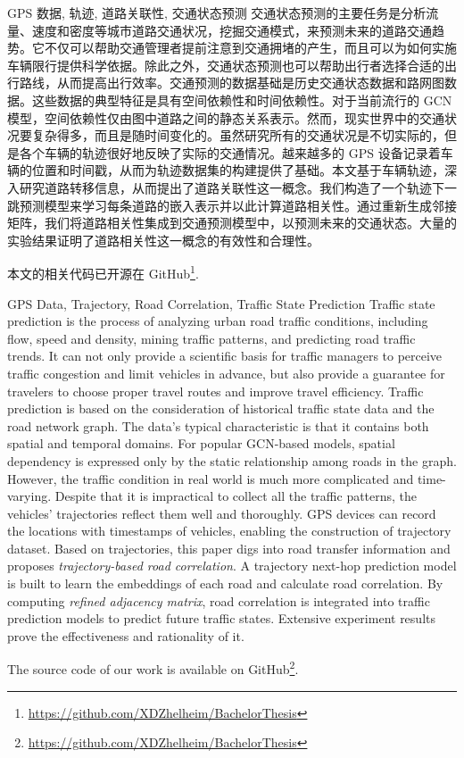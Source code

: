 \begin{中文摘要}{GPS 数据, 轨迹, 道路关联性, 交通状态预测}
  交通状态预测的主要任务是分析流量、速度和密度等城市道路交通状况，挖掘交通模式，来预测未来的道路交通趋势。它不仅可以帮助交通管理者提前注意到交通拥堵的产生，而且可以为如何实施车辆限行提供科学依据。除此之外，交通状态预测也可以帮助出行者选择合适的出行路线，从而提高出行效率。交通预测的数据基础是历史交通状态数据和路网图数据。这些数据的典型特征是具有空间依赖性和时间依赖性。对于当前流行的 GCN 模型，空间依赖性仅由图中道路之间的静态关系表示。然而，现实世界中的交通状况要复杂得多，而且是随时间变化的。虽然研究所有的交通状况是不切实际的，但是各个车辆的轨迹很好地反映了实际的交通情况。越来越多的 GPS 设备记录着车辆的位置和时间戳，从而为轨迹数据集的构建提供了基础。本文基于车辆轨迹，深入研究道路转移信息，从而提出了道路关联性这一概念。我们构造了一个轨迹下一跳预测模型来学习每条道路的嵌入表示并以此计算道路相关性。通过重新生成邻接矩阵，我们将道路相关性集成到交通预测模型中，以预测未来的交通状态。大量的实验结果证明了道路相关性这一概念的有效性和合理性。

  本文的相关代码已开源在 GitHub\footnote{\href{https://github.com/XDZhelheim/BachelorThesis}{https://github.com/XDZhelheim/BachelorThesis}}.
\end{中文摘要}

\begin{英文摘要}{GPS Data, Trajectory, Road Correlation, Traffic State Prediction}
  Traffic state prediction is the process of analyzing urban road traffic conditions, including flow, speed and density, mining traffic patterns, and predicting road traffic trends. It can not only provide a scientific basis for traffic managers to perceive traffic congestion and limit vehicles in advance, but also provide a guarantee for travelers to choose proper travel routes and improve travel efficiency. Traffic prediction is based on the consideration of historical traffic state data and the road network graph. The data's typical characteristic is that it contains both spatial and temporal domains. For popular GCN-based models, spatial dependency is expressed only by the static relationship among roads in the graph. However, the traffic condition in real world is much more complicated and time-varying. Despite that it is impractical to collect all the traffic patterns, the vehicles' trajectories reflect them well and thoroughly. GPS devices can record the locations with timestamps of vehicles, enabling the construction of trajectory dataset. Based on trajectories, this paper digs into road transfer information and proposes \textit{trajectory-based road correlation}. A trajectory next-hop prediction model is built to learn the embeddings of each road and calculate road correlation. By computing \textit{refined adjacency matrix}, road correlation is integrated into traffic prediction models to predict future traffic states. Extensive experiment results prove the effectiveness and rationality of it.

  The source code of our work is available on GitHub\footnote{\href{https://github.com/XDZhelheim/BachelorThesis}{https://github.com/XDZhelheim/BachelorThesis}}.
\end{英文摘要}
